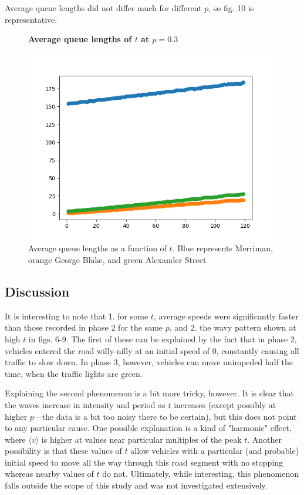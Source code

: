 \documentclass{article}
\begin{document}
Average queue lengths did not differ much for different $p$, so fig. 10 is representative.

\begin{figure}
\textbf{\large Average queue lengths of $t$ at $p=0.3$}\par\medskip
{}
\includegraphics[scale = 0.55, left]{./data/phase3/queue_lengths_vs_t_p=0.3.png}
\vspace*{0.1cm}\hspace*{4.5cm}{\large $t$}
\caption{\label{fig} Average queue lengths as a function of $t$. Blue represents Merriman, orange George Blake, and green Alexander Street}
\end{figure}

\subsection*{Discussion}

It is interesting to note that 1. for some $t$, average speeds were significantly faster than those recorded in phase 2 for the same $p$, and 2. the wavy pattern shown at high $t$ in figs. 6-9. The first of these can be explained by the fact that in phase 2, vehicles entered the road willy-nilly at an initial speed of 0, constantly causing all traffic to slow down. In phase 3, however, vehicles can move unimpeded half the time, when the traffic lights are green.

Explaining the second phenomenon is a bit more tricky, however. It is clear that the waves increase in intensity and period as $t$ increases (except possibly at higher $p$---the data is a bit too noisy there to be certain), but this does not point to any particular cause. One possible explanation is a kind of "harmonic" effect, where $\langle v \rangle$ is higher at values near particular multiples of the peak $t$. Another possibility is that these values of $t$ allow vehicles with a particular (and probable) initial speed to move all the way through this road segment with no stopping whereas nearby values of $t$ do not. Ultimately, while interesting, this phenomenon falls outside the scope of this study and was not investigated extensively.
\end{document}
